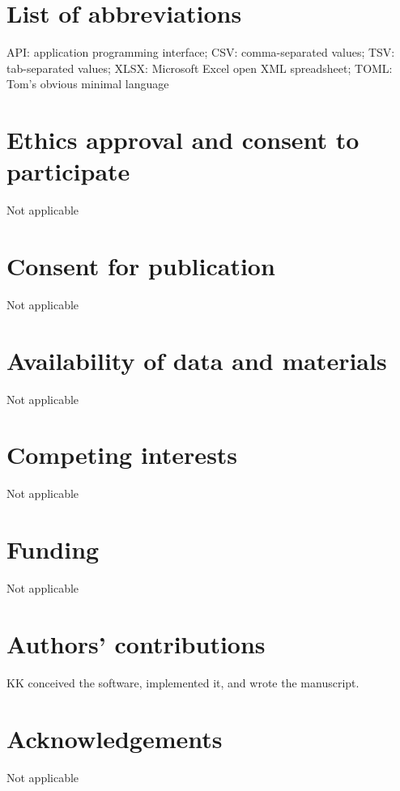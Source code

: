 \documentclass{bmcart}
\begin{document}
\section*{List of abbreviations }

API: application programming interface; CSV: comma-separated values;
TSV: tab-separated values; XLSX: Microsoft Excel open XML spreadsheet;
TOML: Tom's obvious minimal language


\begin{backmatter}

\section*{Ethics approval and consent to participate }
Not applicable

\section*{Consent for publication }
Not applicable

\section*{Availability of data and materials }
Not applicable

\section*{Competing interests}
Not applicable

\section*{Funding }
Not applicable

\section*{Authors' contributions}
KK conceived the software, implemented it, and wrote the manuscript.

\section*{Acknowledgements }
Not applicable


\end{backmatter}
\end{document}
